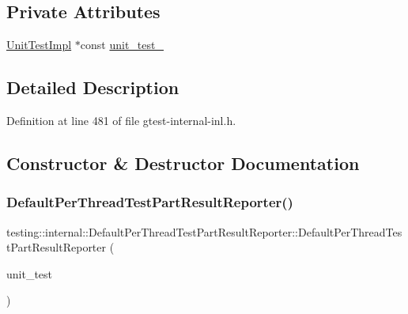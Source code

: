 \subsection*{Private Attributes}
\begin{DoxyCompactItemize}
\item 
\hyperlink{classtesting_1_1internal_1_1UnitTestImpl}{Unit\+Test\+Impl} $\ast$const \hyperlink{classtesting_1_1internal_1_1DefaultPerThreadTestPartResultReporter_a44f8ce831e79b6b25197ce8e4f2e08d6}{unit\+\_\+test\+\_\+}
\end{DoxyCompactItemize}


\subsection{Detailed Description}


Definition at line 481 of file gtest-\/internal-\/inl.\+h.



\subsection{Constructor \& Destructor Documentation}
\mbox{\label{classtesting_1_1internal_1_1DefaultPerThreadTestPartResultReporter_a968a846e5a90d2ffea8b2ce2746099bd}} 
\subsubsection{\texorpdfstring{Default\+Per\+Thread\+Test\+Part\+Result\+Reporter()}{DefaultPerThreadTestPartResultReporter()}}
{\footnotesize\ttfamily testing\+::internal\+::\+Default\+Per\+Thread\+Test\+Part\+Result\+Reporter\+::\+Default\+Per\+Thread\+Test\+Part\+Result\+Reporter (\begin{DoxyParamCaption}\item[{\hyperlink{classtesting_1_1internal_1_1UnitTestImpl}{Unit\+Test\+Impl} $\ast$}]{unit\+\_\+test }\end{DoxyParamCaption})\hspace{0.3cm}{\ttfamily [explicit]}}



